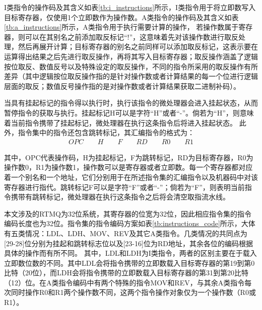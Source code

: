 I类指令的操作码及其含义如表\ref{tb:i_instructions}所示，I类指令用于将立即数写入目标寄存器，仅使用1个立即数作为操作数。A类指令的操作码及其含义如表\ref{tb:a_instructions}所示，A类指令用于执行需要计算的操作，
若操作数属于寄存器，则可以在其别名之前添加取反标记“!”，这意味着先对该操作数进行取反处理，然后再展开计算；目标寄存器的别名之前同样可以添加取反标记，这表示要在运算得出结果之后先进行取反操作，再将其写入目标寄存器；取反操作涵盖了逻辑按位取反、数值反号以及特殊设定的取反操作，不同的指令所采用的取反操作有所差异（其中逻辑按位取反操作指的是针对操作数或者计算结果的每一个位进行逻辑层面的取反；数值反号操作指的是对操作数或者计算结果获取二进制补码）。


当具有挂起标记的指令得以执行时，执行该指令的微处理器会进入挂起状态，从而暂停指令的获取与执行。挂起标记H可以是字符“H”或者“-”。倘若为“H”，则意味着当前指令携带了挂起标记，微处理器在执行这条指令后将进入挂起状态。
此外，指令集中的指令还包含跳转标记，其汇编指令的格式为：
\begin{align}
    OPC \qquad H \qquad F \qquad RD \qquad R0 \qquad R1
\end{align}


其中，OPC代表操作码，H为挂起标记，F为跳转标记，RD为目标寄存器，R0为操作数0，R1为操作数1，操作数可以是寄存器或者立即数。每一个寄存器都对应着一个别名和一个地址，它们分别用于在所述指令集的汇编指令以及机器码中对该寄存器进行指代。跳转标记F可以是字符“F”或者“-”；倘若为“F”，则表明当前指令携带有跳转标记，微处理器在执行这条指令之后将会清空取指流水线。





本文涉及的RTMQ为32位系统，其寄存器的位宽为32位，因此相应指令集的指令编码长度也为32位。指令集的指令编码方案如表\ref{tb:instructions_code}所示，大体有五类情况：LDL、LDH、MOV、REV及其它A类指令。几类情况的共同点为[29-28]位分别为挂起和跳转标志位以及[23-16]位为RD地址，其余各位的编码根据具体的操作而有所不同。
其中，LDL和LDH为I类指令，两者的区别主要在于载入立即数位数的不同。其中LDL会将指令携带的立即数载入目标寄存器的第19到第0比特（20位），而LDH会将指令携带的立即数载入目标寄存器的第31到第20比特（12）位。在A类指令编码中有两个特殊的指令MOV和REV，与其余A类指令每次同时操作R0和R1两个操作数不同，这两个指令操作对象仅为一个操作数（R0或R1）。

